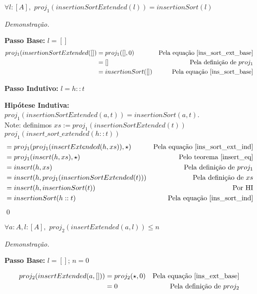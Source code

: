 \documentclass[12pt, oneside, a4paper,english,brazil]{abntex2}
\begin{document}
\begin{teorema}
  $\forall l : [A], \,\, proj_{1}(insertionSortExtended(l)) = insertionSort(l)$
\end{teorema}

\noindent \textit{Demonstra\c{c}\~ao.}

\textbf{Passo Base: } $l = []$
\begin{align*}
  proj_{1}(insertionSortExtended([])  &= proj_{1}([], 0) &\text{Pela equa\c{c}\~ao \ref{ins_sort_ext_base}} \\
                                                               &= [] &\text{Pela defini\c{c}\~ao de } proj_1 \\
  &= insertionSort([]) &\text{Pela equa\c{c}\~ao \ref{ins_sort_base}}
\end{align*}


\textbf{Passo Indutivo: } $l = h :: t$

\textbf{Hip\'otese Indutiva: } $proj_{1}(insertionSortExtended(a, t)) = insertionSort(a, t)$.\\

Note: definimos $xs := proj_{1}(insertionSortExtended(t))$\\

$proj_{1}(insert\_sort\_extended(h :: t))$
\begin{align*}
  &= proj_{1}(proj_{1}(insertExtended(h, xs)), \star) &\text{Pela equa\c{c}\~ao \ref{ins_sort_ext_ind}} \\
                                          &= proj_{1}(insert(h, xs), \star) &\text{Pelo teorema \ref{insert_eq}} \\
  &= insert(h, xs) &\text{Pela defini\c{c}\~ao de } proj_1 \\
  &= insert(h, proj_{1}(insertionSortExtended(t))) &\text{Pela defini\c{c}\~ao de $xs$}\\
  &= insert(h, insertionSort(t)) &\text{Por HI} \\
  &= insertionSort(h :: t) &\text{Pela equa\c{c}\~ao \ref{ins_sort_ind}}
\end{align*}
\qed


\begin{teorema} \label{count_ins}
  $\forall a : A, l : [A], \,\, proj_{2}(insertExtended(a, l)) \le n$
\end{teorema}

\noindent \textit{Demonstra\c{c}\~ao.}

\textbf{Passo Base: } $l = []$; $n = 0$

\begin{align*}
  proj_{2}(insertExtended(a, [])) &= proj_{2}(\star, 0) &\text{Pela equa\c{c}\~ao \ref{ins_ext_base}} \\
  &= 0 &\text{Pela defini\c{c}\~ao de } proj_{2}
\end{align*}
\end{document}
